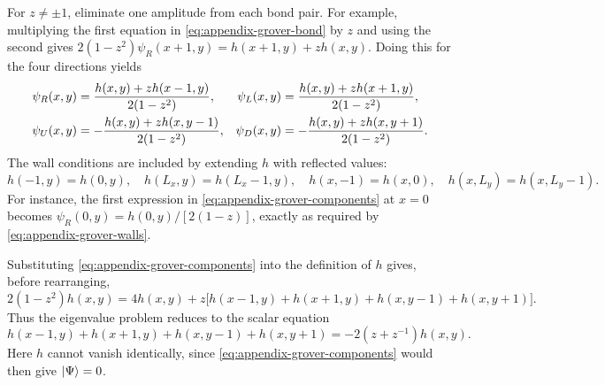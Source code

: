 For $z\neq\pm1$, eliminate one amplitude from each bond pair. For example,
multiplying the first equation in \eqref{eq:appendix-grover-bond} by $z$
and using the second gives
$2(1-z^2)\psi_R(x+1,y)=h(x+1,y)+zh(x,y)$.
Doing this for the four directions yields
\begin{align}
 \psi_R(x,y)&=\frac{h(x,y)+zh(x-1,y)}{2(1-z^2)},&
 \psi_L(x,y)&=\frac{h(x,y)+zh(x+1,y)}{2(1-z^2)},\notag\\
 \psi_U(x,y)&=-\frac{h(x,y)+zh(x,y-1)}{2(1-z^2)},&
 \psi_D(x,y)&=-\frac{h(x,y)+zh(x,y+1)}{2(1-z^2)}.
 \label{eq:appendix-grover-components}
\end{align}
The wall conditions are included by extending $h$ with reflected values:
\begin{equation}
 h(-1,y)=h(0,y),\quad h(L_x,y)=h(L_x-1,y),\quad
 h(x,-1)=h(x,0),\quad h(x,L_y)=h(x,L_y-1).
 \label{eq:appendix-grover-endpoints}
\end{equation}
For instance, the first expression in
\eqref{eq:appendix-grover-components} at $x=0$ becomes
$\psi_R(0,y)=h(0,y)/[2(1-z)]$, exactly as required by
\eqref{eq:appendix-grover-walls}.

Substituting \eqref{eq:appendix-grover-components} into the definition of
$h$ gives, before rearranging,
\[
 2(1-z^2)h(x,y)
 =4h(x,y)+z\big[h(x-1,y)+h(x+1,y)+h(x,y-1)+h(x,y+1)\big].
\]
Thus the eigenvalue problem reduces to the scalar equation
\begin{equation}
 h(x-1,y)+h(x+1,y)+h(x,y-1)+h(x,y+1)
 =-2(z+z^{-1})h(x,y).
 \label{eq:appendix-grover-reduced}
\end{equation}
Here $h$ cannot vanish identically, since
\eqref{eq:appendix-grover-components} would then give $\ket{\Psi}=0$.

